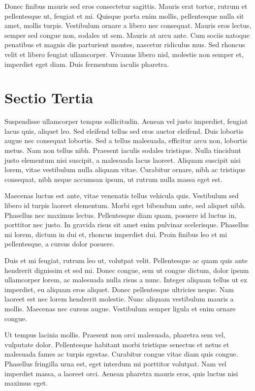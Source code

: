 Donec finibus mauris sed eros consectetur sagittis. Mauris erat tortor, rutrum et pellentesque ut, feugiat et mi. Quisque porta enim mollis, pellentesque nulla sit amet, mollis turpis. Vestibulum ornare a libero nec consequat. Mauris eros lectus, semper sed congue non, sodales ut sem. Mauris at arcu ante. Cum sociis natoque penatibus et magnis dis parturient montes, nascetur ridiculus mus. Sed rhoncus velit et libero feugiat ullamcorper. Vivamus libero nisl, molestie non semper et, imperdiet eget diam. Duis fermentum iaculis pharetra.

\section{Sectio Tertia}
Suspendisse ullamcorper tempus sollicitudin. Aenean vel justo imperdiet, feugiat lacus quis, aliquet leo. Sed eleifend tellus sed eros auctor eleifend. Duis lobortis augue nec consequat lobortis. Sed a tellus malesuada, efficitur arcu non, lobortis metus. Nam non tellus nibh. Praesent iaculis sodales tristique. Nulla tincidunt justo elementum nisi suscipit, a malesuada lacus laoreet. Aliquam suscipit nisi lorem, vitae vestibulum nulla aliquam vitae. Curabitur ornare, nibh ac tristique consequat, nibh neque accumsan ipsum, ut rutrum nulla massa eget est.

Maecenas luctus est ante, vitae venenatis tellus vehicula quis. Vestibulum sed libero id turpis laoreet elementum. Morbi eget bibendum ante, sed aliquet nibh. Phasellus nec maximus lectus. Pellentesque diam quam, posuere id luctus in, porttitor nec justo. In gravida risus sit amet enim pulvinar scelerisque. Phasellus mi lorem, dictum in dui et, rhoncus imperdiet dui. Proin finibus leo et mi pellentesque, a cursus dolor posuere.

Duis et mi feugiat, rutrum leo ut, volutpat velit. Pellentesque ac quam quis ante hendrerit dignissim et sed mi. Donec congue, sem ut congue dictum, dolor ipsum ullamcorper lorem, ac malesuada nulla risus a nunc. Integer aliquam tellus ut ex imperdiet, eu aliquam eros aliquet. Donec pellentesque ultricies neque. Nam laoreet est nec lorem hendrerit molestie. Nunc aliquam vestibulum mauris a mollis. Maecenas nec cursus augue. Vestibulum semper ligula et enim ornare congue.

Ut tempus lacinia mollis. Praesent non orci malesuada, pharetra sem vel, vulputate dolor. Pellentesque habitant morbi tristique senectus et netus et malesuada fames ac turpis egestas. Curabitur congue vitae diam quis congue. Phasellus fringilla urna est, eget interdum mi porttitor volutpat. Nam vel imperdiet massa, a laoreet orci. Aenean pharetra mauris eros, quis luctus nisi maximus eget.

